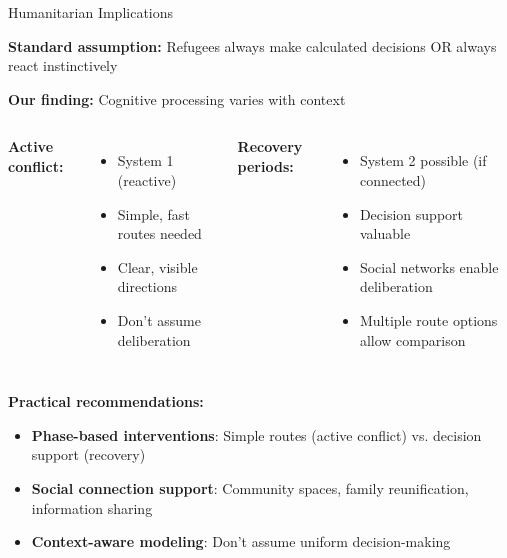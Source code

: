 \documentclass[aspectratio=169]{beamer}
\begin{document}
\begin{frame}{Humanitarian Implications}

\textbf{Standard assumption:} Refugees always make calculated decisions OR always react instinctively

\vspace{0.5em}

\textbf{Our finding:} Cognitive processing varies with context

\begin{columns}[T]
\textbf{Active conflict:}
\begin{itemize}
    \item System 1 (reactive)
    \item Simple, fast routes needed
    \item Clear, visible directions
    \item Don't assume deliberation
\end{itemize}

\textbf{Recovery periods:}
\begin{itemize}
    \item System 2 possible (if connected)
    \item Decision support valuable
    \item Social networks enable deliberation
    \item Multiple route options allow comparison
\end{itemize}
\end{columns}

\vspace{0.5em}

\textbf{Practical recommendations:}
\begin{itemize}
    \item \textbf{Phase-based interventions}: Simple routes (active conflict) vs. decision support (recovery)
    \item \textbf{Social connection support}: Community spaces, family reunification, information sharing
    \item \textbf{Context-aware modeling}: Don't assume uniform decision-making
\end{itemize}

\end{frame}
\end{document}
